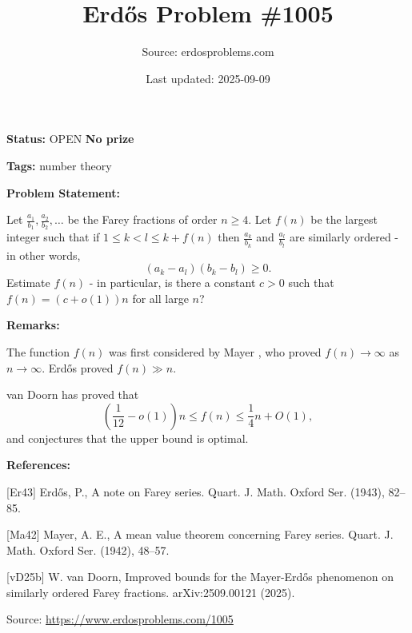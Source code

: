 \documentclass{article}
\title{Erd\H{o}s Problem \#1005}
\date{Last updated: 2025-09-09}
\author{Source: erdosproblems.com}
\begin{document}
\maketitle

\noindent\textbf{Status:} OPEN \quad \textbf{No prize}

\noindent\textbf{Tags:} number theory

\medskip
\noindent\textbf{Problem Statement:}

Let $\frac{a_1}{b_1},\frac{a_2}{b_2},\ldots$ be the Farey fractions of order $n\geq 4$. Let $f(n)$ be the largest integer such that if $1\leq k<l\leq k+f(n)$ then $\frac{a_k}{b_k}$ and $\frac{a_l}{b_l}$ are similarly ordered - in other words,\[(a_k-a_l)(b_k-b_l)\geq 0.\]Estimate $f(n)$ - in particular, is there a constant $c>0$ such that $f(n)=(c+o(1))n$ for all large $n$?

\bigskip
\noindent\textbf{Remarks:}

The function $f(n)$ was first considered by Mayer \cite{Ma42}, who proved $f(n)\to \infty$ as $n\to \infty$. Erd\H{o}s \cite{Er43} proved $f(n)\gg n$.

van Doorn \cite{vD25b} has proved that\[\left(\frac{1}{12}-o(1)\right)n\leq f(n) \leq \frac{1}{4}n+O(1),\]and conjectures that the upper bound is optimal.

\bigskip
\noindent\textbf{References:}

[Er43] Erd\H{o}s, P., A note on {F}arey series. Quart. J. Math. Oxford Ser. (1943), 82--85.
 
 [Ma42] Mayer, A. E., A mean value theorem concerning {F}arey series. Quart. J. Math. Oxford Ser. (1942), 48--57.
 
 [vD25b] W. van Doorn, Improved bounds for the Mayer-Erd\H{o}s phenomenon on similarly ordered Farey fractions. arXiv:2509.00121 (2025).

\bigskip
\noindent\small{Source: \url{https://www.erdosproblems.com/1005}}
\end{document}
